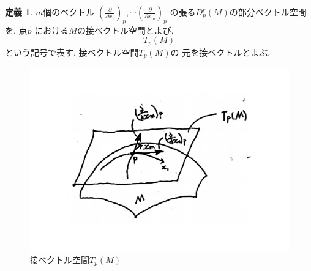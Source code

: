 \documentclass[a4j,12pt]{jarticle}
\theoremstyle{definition}
\newtheorem{definition}[theorem]{定義}
\begin{document}
    \begin{definition}\label{def:tangent vector space}
        $m$個のベクトル
        $\left(\frac{\partial}{\partial x_1}\right)_p, 
        \cdots 
        \left(\frac{\partial}{\partial x_m}\right)_p$
        の張る$D_p^r(M)$の部分ベクトル空間を, 点$p$
        における$M$の接ベクトル空間とよび, 
        $$T_p(M)$$
        という記号で表す. 接ベクトル空間$T_p(M)$の
        元を接ベクトルとよぶ. 
    \end{definition}
    \begin{figure}[H]
        \centering
        \includegraphics[keepaspectratio, scale=0.4]{tangentVectorSpace_2.pdf}
        \caption{接ベクトル空間$T_p(M)$}
        \label{tangentVectorSpace}
       \end{figure}
       
\end{document}
